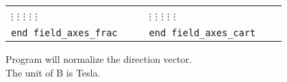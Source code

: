 \documentclass[10pt]{report}
\begin{document}
\begin{itemize}
\begin{center}
\begin{tabular}{p{0.4\linewidth}p{0.4\linewidth}}
           \hspace{0.3cm}  $\vdots$ \hspace{0.9cm}    $\vdots$ \hspace{0.45cm} $\vdots$ \hspace{0.45cm} $\vdots$ \hspace{0.55cm} $\vdots$             &   
           \hspace{0.3cm}  $\vdots$ \hspace{0.9cm}    $\vdots$ \hspace{0.45cm} $\vdots$ \hspace{0.55cm} $\vdots$ \hspace{0.4cm} $\vdots$ \\
        {\tt end field\_axes\_frac}    & {\tt end field\_axes\_cart} \\
        \bottomrule
    \end{tabular}
\end{center}
Program will normalize the direction vector.\\
The unit of B is Tesla.
\end{itemize}
\end{document}
